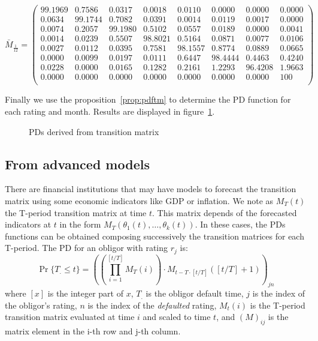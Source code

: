 \documentclass[11pt,fleqn]{book} %
\begin{document}
\begin{example}
{\begin{displaymath}
		\bar{M}_{\frac{1}{12}} = \left(
		\begin{array}{cccccccc}
			99.1969 &  0.7586 &  0.0317 &  0.0018 &  0.0110 &  0.0000 &  0.0000 &   0.0000 \\
			 0.0634 & 99.1744 &  0.7082 &  0.0391 &  0.0014 &  0.0119 &  0.0017 &   0.0000 \\
			 0.0074 &  0.2057 & 99.1980 &  0.5102 &  0.0557 &  0.0189 &  0.0000 &   0.0041 \\
			 0.0014 &  0.0239 &  0.5507 & 98.8021 &  0.5164 &  0.0871 &  0.0077 &   0.0106 \\
			 0.0027 &  0.0112 &  0.0395 &  0.7581 & 98.1557 &  0.8774 &  0.0889 &   0.0665 \\
			 0.0000 &  0.0099 &  0.0197 &  0.0111 &  0.6447 & 98.4444 &  0.4463 &   0.4240 \\
			 0.0228 &  0.0000 &  0.0165 &  0.1282 &  0.2161 &  1.2293 & 96.4208 &   1.9663 \\
			 0.0000 &  0.0000 &  0.0000 &  0.0000 &  0.0000 &  0.0000 &  0.0000 & 100 \\
		\end{array}
		\right)
	\end{displaymath}\par}
	Finally we use the proposition~\ref{prop:pdftm} to determine the 
	PD function for each rating and month. Results are displayed in 
	figure~\ref{fig:pdftm}.
	\begin{figure}[!ht]
		\centering
		\caption{PDs derived from transition matrix}
		\label{fig:pdftm}
	\end{figure}
\end{example}

\subsection{From advanced models}

There are financial institutions that may have models to forecast 
the transition matrix using some economic indicators like GDP
or inflation. We note as $M_T(t)$ the T-period transition matrix
at time $t$. This matrix depends of the forecasted indicators at 
$t$ in the form $M_T(\theta_1(t),\dots,\theta_k(t))$. In these 
cases, the PDs functions can be obtained composing successively
the transition matrices for each T-period. The PD for an obligor
with rating $r_j$ is:
\begin{displaymath}
	\Pr\{T_. \le t\} = \left(
		\left( \prod_{i=1}^{[t/T]} M_T(i) \right) \cdot 
		M_{t-T\cdot[t/T]}\left([t/T]+1\right) 
		\right)_{jn}
\end{displaymath}
where $[x]$ is the integer part of $x$, $T_.$ is the obligor default time, 
$j$ is the index of the obligor's rating, $n$ is the index of the 
\emph{defaulted} rating, $M_t(i)$ is the T-period transition matrix 
evaluated at time $i$ and scaled to time $t$, and $(M)_{ij}$ is the 
matrix element in the i-th row and j-th column.
\end{document}
